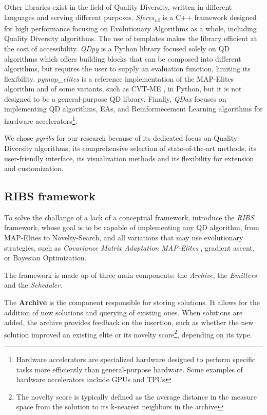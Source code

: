 \documentclass{Configuration_Files/PoliMi3i_thesis}
\begin{document}
Other libraries exist in the field of Quality Diversity, written in different languages and serving different purposes. \textit{Sferes\textsubscript{v2}} \cite{mouret_sferesv2_2010} is a C++ framework designed for high performance focusing on Evolutionary Algorithms as a whole, including Quality Diversity algorithms. The use of templates makes the library efficient at the cost of accessibility. 
\textit{QDpy} \cite{cazenille_qdpy_2018} is a Python library focused solely on QD algorithms which offers building blocks that can be composed into different algorithms, but requires the user to supply an evaluation function, limiting its flexibility. 
\textit{pymap\_elites} \cite{mouret_python3_2019}  is a reference implementation of the MAP-Elites algorithm and of some variants, such as CVT-ME \cite{vassiliades_using_2017}, in Python, but it is not designed to be a general-purpose QD library.
Finally, \textit{QDax} \cite{lim_accelerated_2022} focuses on implementing QD algorithms, EAs, and Reinformecement Learning algorithms for hardware accelerators\footnote{Hardware accelerators are specialized hardware designed to perform specific tasks more efficiently than general-purpose hardware. Some examples of hardware accelerators include GPUs and TPUs}.

We chose \textit{pyribs} for our research because of its dedicated focus on Quality Diversity algorithms, its comprehensive selection of state-of-the-art methods, its user-friendly interface, its visualization methods and its flexibility for extension and customization. 

\subsection{RIBS framework}
\label{sec:ribs}

To solve the challange of a lack of a conceptual framework, \citeauthor{tjanaka_pyribs_2023} introduce the \textit{RIBS} framework, whose goal is to be capable of implementing any QD algorithm, from MAP-Elites to Novelty-Search, and all variations that may use evolutionary strategies, such as  \textit{Covariance Matrix Adaptation MAP-Elites} \cite{fontaine_covariance_2020}, gradient ascent, or Bayesian Optimization.

The framework is made up of three main components: the \textit{Archive}, the \textit{Emitters} and the \textit{Scheduler}.

The \textbf{Archive} is the component responsible for storing solutions. It allows for the addition of new solutions and querying of existing ones. When solutions are added, the archive provides feedback on the insertion, such as whether the new solution improved an existing elite or its novelty score\footnote{The novelty score is typically defined as the average distance in the measure space from the solution to its k-nearest neighbors in the archive}, depending on its type.
\end{document}
